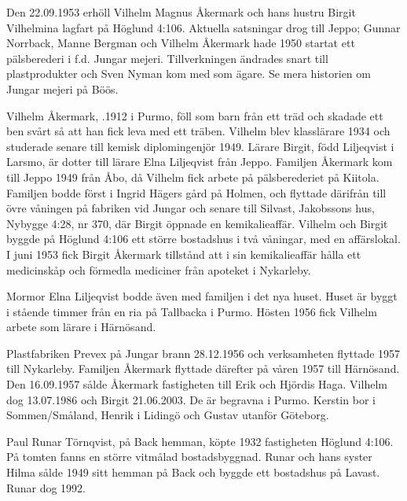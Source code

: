 %
Den 22.09.1953 erhöll Vilhelm Magnus Åkermark och hans hustru	Birgit Vilhelmina lagfart på Höglund 4:106. Aktuella satsningar drog till Jeppo; Gunnar Norrback, Manne Bergman och Vilhelm Åkermark hade 1950 startat ett pälsberederi i f.d. Jungar mejeri. Tillverkningen ändrades snart till plastprodukter och Sven Nyman kom med som ägare. Se mera historien om Jungar mejeri på Böös.

Vilhelm Åkermark, .1912 i Purmo, föll som barn från ett träd och skadade ett ben svårt så att han fick leva med ett träben. Vilhelm blev klasslärare 1934 och studerade senare till kemisk diplomingenjör 1949. Lärare Birgit, född Liljeqvist i Larsmo, är dotter till lärare Elna Liljeqvist från Jeppo. Familjen Åkermark kom till Jeppo 1949 från Åbo, då Vilhelm	fick arbete på pälsberederiet på Kiitola. Familjen bodde först i Ingrid Hägers gård på Holmen, och flyttade därifrån till övre våningen på fabriken vid Jungar och senare till Silvast, Jakobssons hus, Nybygge 4:28, nr 370, där Birgit öppnade en kemikalieaffär. Vilhelm och Birgit byggde på Höglund 4:106 ett större bostadshus i två våningar, med en 	affärslokal. I juni 1953 fick Birgit Åkermark tillstånd att i sin kemikalieaffär hålla ett medicinskåp och förmedla mediciner från apoteket i Nykarleby.
\begin{jhchildren}
  \item {}
  \item {}
  \item {}
\end{jhchildren}
Mormor Elna Liljeqvist bodde även med familjen i det nya huset. Huset är byggt i stående timmer från en ria på Tallbacka i Purmo. Hösten 1956 fick Vilhelm arbete som lärare i Härnösand.

Plastfabriken Prevex på Jungar brann 28.12.1956 och verksamheten flyttade 1957 till Nykarleby. Familjen Åkermark flyttade därefter på våren 1957 till Härnösand. Den 16.09.1957 sålde Åkermark fastigheten till Erik och Hjördis Haga. Vilhelm dog 13.07.1986 och Birgit 21.06.2003. De är begravna i Purmo. Kerstin bor i Sommen/Småland, Henrik i Lidingö och Gustav utanför Göteborg.


%
Paul Runar Törnqvist,  på Back hemman, köpte 1932 fastigheten Höglund 4:106. På tomten fanns en större vitmålad bostadsbyggnad. Runar och hans syster Hilma sålde 1949 sitt hemman på Back och byggde ett bostadshus på Lavast. Runar dog 1992.


